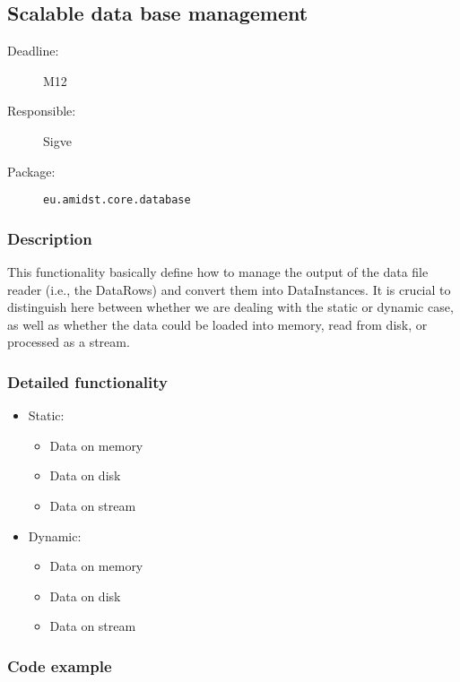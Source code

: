 \newpage
\subsection{Scalable data base management}
\label{ScalableDataInstanceManagement:ID}

\begin{description}
\item[Deadline:] M12
\item[Responsible:] Sigve
\item[Package:] \texttt{eu.amidst.core.database}
\end{description}

\subsubsection*{Description}

This functionality basically define how to manage the output of the data file reader (i.e., the DataRows) and convert them into DataInstances. It is crucial to distinguish here between whether we are dealing with the static or dynamic case, as well as whether the data could be loaded into memory, read from disk, or processed as a stream.

\subsubsection*{Detailed functionality}

\begin{itemize}
\item Static:

\begin{itemize}
\item Data on memory
\item Data on disk
\item Data on stream
\end{itemize}

\item Dynamic:

\begin{itemize}
\item Data on memory
\item Data on disk
\item Data on stream
\end{itemize}

\end{itemize}

\subsubsection*{Code example}
